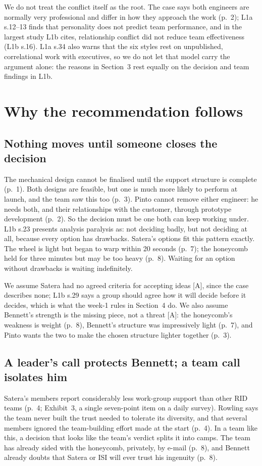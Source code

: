 \documentclass[oneside,final,11pt,letterpaper]{article}
\begin{document}
We do not treat the conflict itself as the root. The case says both engineers are normally very professional and differ in how they approach the work (p.~2); L1a s.12--13 finds that personality does not predict team performance, and in the largest study L1b cites, relationship conflict did not reduce team effectiveness (L1b s.16). L1a s.34 also warns that the six styles rest on unpublished, correlational work with executives, so we do not let that model carry the argument alone: the reasons in Section~3 rest equally on the decision and team findings in L1b.

\section[Why the recommendation follows]{Why the recommendation follows}
\subsection{Nothing moves until someone closes the decision}
The mechanical design cannot be finalised until the support structure is complete (p.~1). Both designs are feasible, but one is much more likely to perform at launch, and the team saw this too (p.~3). Pinto cannot remove either engineer: he needs both, and their relationships with the customer, through prototype development (p.~2). So the decision must be one both can keep working under. L1b s.23 presents analysis paralysis as: not deciding badly, but not deciding at all, because every option has drawbacks. Satera's options fit this pattern exactly. The wheel is light but began to warp within 20 seconds (p.~7); the honeycomb held for three minutes but may be too heavy (p.~8). Waiting for an option without drawbacks is waiting indefinitely.

We assume Satera had no agreed criteria for accepting ideas [A], since the case describes none; L1b s.29 says a group should agree how it will decide before it decides, which is what the week-1 rules in Section~4 do. We also assume Bennett's strength is the missing piece, not a threat [A]: the honeycomb's weakness is weight (p.~8), Bennett's structure was impressively light (p.~7), and Pinto wants the two to make the chosen structure lighter together (p.~3).

\subsection{A leader's call protects Bennett; a team call isolates him}
Satera's members report considerably less work-group support than other RID teams (p.~4; Exhibit~3, a single seven-point item on a daily survey). Rowling says the team never built the trust needed to tolerate its diversity, and that several members ignored the team-building effort made at the start (p.~4). In a team like this, a decision that looks like the team's verdict splits it into camps. The team has already sided with the honeycomb, privately, by e-mail (p.~8), and Bennett already doubts that Satera or ISI will ever trust his ingenuity (p.~8).
\end{document}
